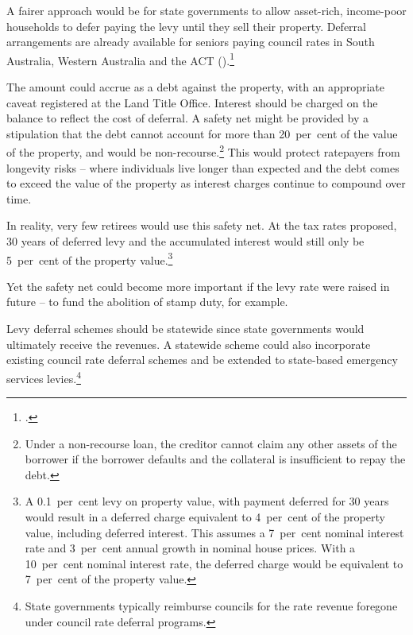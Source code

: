\documentclass[twoside,english]{palatinob5portrait}
\begin{document}
A fairer approach would be for state governments to allow asset-rich, income-poor households to defer paying the levy until they sell their property. Deferral arrangements are already available for seniors paying council rates in South Australia, Western Australia and the ACT ().\footcite{Brownfield2014} 

The amount could accrue as a debt against the property, with an appropriate caveat registered at the Land Title Office. Interest should be charged on the balance to reflect the cost of deferral. A safety net might be provided by a stipulation that the debt cannot account for more than 20~per~cent of the value of the property, and would be non-recourse.\footnote{Under a non-recourse loan, the creditor cannot claim any other assets of the borrower if the borrower defaults and the collateral is insufficient to repay the debt.}  This would protect ratepayers from longevity risks – where individuals live longer than expected and the debt comes to exceed the value of the property as interest charges continue to compound over time. 

In reality, very few retirees would use this safety net. At the tax rates proposed, 30 years of deferred levy and the accumulated interest would still only be 5~per~cent of the property value.\footnote{A 0.1~per~cent levy on property value, with payment deferred for 30 years would result in a deferred charge equivalent to 4~per~cent of the property value, including deferred interest. This assumes a 7~per~cent nominal interest rate and 3~per~cent annual growth in nominal house prices. With a 10~per~cent nominal interest rate, the deferred charge would be equivalent to 7~per~cent of the property value.}  

Yet the safety net could become more important if the levy rate were raised in future -- to fund the abolition of stamp duty, for example. 

Levy deferral schemes should be statewide since state governments would ultimately receive the revenues. A statewide scheme could also incorporate existing council rate deferral schemes and be extended to state-based emergency services levies.\footnote{State governments typically reimburse councils for the rate revenue foregone under council rate deferral programs.} 
\end{document}

